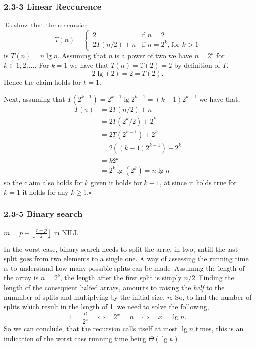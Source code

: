 \documentclass{article}
\let\oldReturn\Return
\renewcommand{\Return}{\State\oldReturn}
\providecommand{\floor}[1]{\left \lfloor #1 \right \rfloor }
\begin{document}
\subsubsection*{2.3-3 Linear Reccurence}

To show that the reccursion 
\begin{equation*}
T(n) = \begin{cases}
2 &           \text{if $n=2$}\\
2T(n/2) + n & \text{if $n=2^k$, for $k>1$}
\end{cases} 
\end{equation*}
is $T(n)=n \lg n$. Assuming that $n$ is a power of two we have $n=2^k$ for $k\in{1,2,\ldots}$. For $k=1$ we have that $T(n)=T(2)=2$ by definition of $T$.  
\[
2 \lg(2) = 2 = T(2).
\]
Hence the claim holds for $k=1$.

Next, assuming that $T(2^{k-1})= 2^{k-1}\lg 2^{k-1} = (k-1)2^{k-1}$ we have that,
\begin{equation*}
\begin{split}
T(n)   & = 2T(n/2) + n \\
       & = 2T(2^k/2) + 2^k \\
       & = 2T(2^{k-1}) + 2^k \\
       & = 2((k-1)2^{k-1}) + 2^k \\
       & = k2^k \\
       & = 2^k \lg(2^k) = n \lg n
\end{split}
\end{equation*}
so the claim also holds for $k$ given it holds for $k-1$, at since it holds true for $k=1$ it holds for any $k\geq1$.\hfill $\square$

\subsubsection*{2.3-5 Binary search}

\begin{algorithmic}[1]
	\State $m=p + \floor{\frac{r - p}{2}}$
		\Return m
		\Return {}
		\Return {}
	\EndIf
\EndIf
\Return NILL
\EndProcedure
\end{algorithmic}

In the worst case, binary search needs to split the array in two, untill the last split goes from two elements to a single one. A way of assessing the running time is to understand how many possible splits can be made. Assuming the length of the array is $n=2^k$, the length after the first split is simply $n/2$. Finding the length of the consequent halfed arrays, amounts to raising the \emph{half} to the nummber of splits and multiplying by the initial size, $n$. So, to find the number of splits which result in the length of 1, we need to solve the following,
\[
1 = \frac{n}{2^x} \quad\Leftrightarrow\quad 2^x = n \quad\Leftrightarrow\quad x = \lg n. 
\]
So we can conclude, that the recursion calls itself at most  $\lg n$ times, this is an indication of the worst case running time being $\Theta(\lg n)$.
\end{document}
